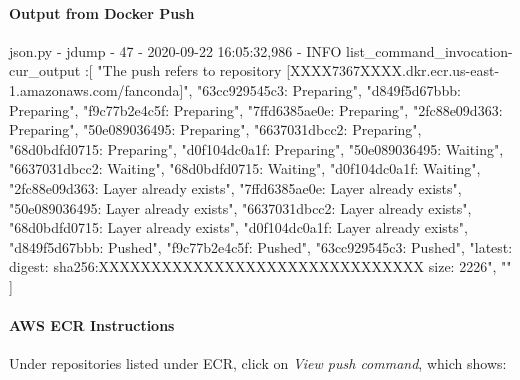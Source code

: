 \documentclass[
]{book}
\newenvironment{Shaded}{\begin{snugshade}}{\end{snugshade}}
\newcommand{\ExtensionTok}[1]{#1}
\newcommand{\NormalTok}[1]{#1}
\newcommand{\StringTok}[1]{\textcolor[rgb]{0.31,0.60,0.02}{#1}}
\begin{document}
\hypertarget{output-from-docker-push}{%
\paragraph{Output from Docker Push}\label{output-from-docker-push}}

\begin{Shaded}
\begin{Highlighting}[]
\ExtensionTok{json.py}\NormalTok{ {-} jdump {-} 47 {-}  2020{-}09{-}22 16:05:32,986 {-} INFO list\_command\_invocation{-}cur\_output}
\NormalTok{:[}
    \StringTok{"The push refers to repository [XXXX7367XXXX.dkr.ecr.us{-}east{-}1.amazonaws.com/fanconda]"}\NormalTok{,}
    \StringTok{"63cc929545c3: Preparing"}\NormalTok{,}
    \StringTok{"d849f5d67bbb: Preparing"}\NormalTok{,}
    \StringTok{"f9c77b2e4c5f: Preparing"}\NormalTok{,}
    \StringTok{"7ffd6385ae0e: Preparing"}\NormalTok{,}
    \StringTok{"2fc88e09d363: Preparing"}\NormalTok{,}
    \StringTok{"50e089036495: Preparing"}\NormalTok{,}
    \StringTok{"6637031dbcc2: Preparing"}\NormalTok{,}
    \StringTok{"68d0bdfd0715: Preparing"}\NormalTok{,}
    \StringTok{"d0f104dc0a1f: Preparing"}\NormalTok{,}
    \StringTok{"50e089036495: Waiting"}\NormalTok{,}
    \StringTok{"6637031dbcc2: Waiting"}\NormalTok{,}
    \StringTok{"68d0bdfd0715: Waiting"}\NormalTok{,}
    \StringTok{"d0f104dc0a1f: Waiting"}\NormalTok{,}
    \StringTok{"2fc88e09d363: Layer already exists"}\NormalTok{,}
    \StringTok{"7ffd6385ae0e: Layer already exists"}\NormalTok{,}
    \StringTok{"50e089036495: Layer already exists"}\NormalTok{,}
    \StringTok{"6637031dbcc2: Layer already exists"}\NormalTok{,}
    \StringTok{"68d0bdfd0715: Layer already exists"}\NormalTok{,}
    \StringTok{"d0f104dc0a1f: Layer already exists"}\NormalTok{,}
    \StringTok{"d849f5d67bbb: Pushed"}\NormalTok{,}
    \StringTok{"f9c77b2e4c5f: Pushed"}\NormalTok{,}
    \StringTok{"63cc929545c3: Pushed"}\NormalTok{,}
    \StringTok{"latest: digest: sha256:XXXXXXXXXXXXXXXXXXXXXXXXXXXXXXX size: 2226"}\NormalTok{,}
    \StringTok{""}
\NormalTok{]}
\end{Highlighting}
\end{Shaded}

\hypertarget{aws-ecr-instructions}{%
\paragraph{AWS ECR Instructions}\label{aws-ecr-instructions}}

Under repositories listed under ECR, click on \emph{View push command}, which shows:
\end{document}
